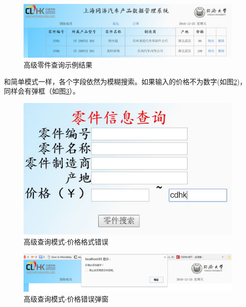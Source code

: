 \begin{figure}[H]
\centering
\includegraphics[width=0.9\linewidth]{figure/seniorPartRes}
\caption{高级零件查询示例结果}
\label{fig:seniorPartRes}
\end{figure}

和简单模式一样，各个字段依然为模糊搜索。如果输入的价格不为数字(如图\ref{fig:seniorNumError})，同样会有弹框（如图\ref{fig:seniorNumErrorAlert}）。

\begin{figure}[H]
\centering
\includegraphics[width=0.7\linewidth]{figure/seniorNumError}
\caption{高级查询模式-价格格式错误}
\label{fig:seniorNumError}
\end{figure}

\begin{figure}[H]
\centering
\includegraphics[width=0.7\linewidth]{figure/seniorNumErrorAlert}
\caption{高级查询模式-价格错误弹窗}
\label{fig:seniorNumErrorAlert}
\end{figure}


